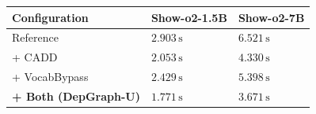 \TGformat{}
\begin{tabular}{>{\raggedright\arraybackslash}p{104.80pt}>{\centering\arraybackslash}p{73.00pt}>{\centering\arraybackslash}p{73.00pt}}
\toprule
\textbf{Configuration} & \textbf{Show-o2-1.5B} & \textbf{Show-o2-7B} \\
\midrule
Reference & $2.903\,\mathrm{s}$ & $6.521\,\mathrm{s}$ \\
+ CADD & $2.053\,\mathrm{s}$ & $4.330\,\mathrm{s}$ \\
+ VocabBypass & $2.429\,\mathrm{s}$ & $5.398\,\mathrm{s}$ \\
\rowcolor{TGshade}
\textbf{+ Both (DepGraph-U)} & $1.771\,\mathrm{s}$ & $3.671\,\mathrm{s}$ \\
\bottomrule
\end{tabular}\par
